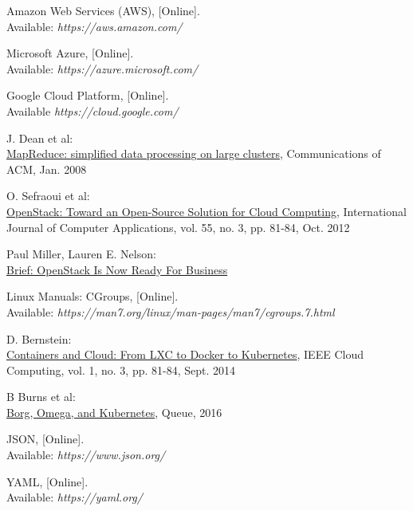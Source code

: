 \documentclass[officiallayout]{tktla}
\begin{document}
\begin{thebibliography}{9}

Amazon Web Services (AWS), [Online]. \\
Available: \textit{https://aws.amazon.com/}

Microsoft Azure, [Online]. \\
Available: \textit{https://azure.microsoft.com/}

Google Cloud Platform, [Online]. \\
Available \textit{https://cloud.google.com/}

J. Dean et al:
\\\href{https://dl.acm.org/doi/abs/10.1145/1327452.1327492}
{MapReduce: simplified data processing on large clusters},
Communications of ACM, Jan. 2008

O. Sefraoui et al:
\\\href{https://pdfs.semanticscholar.org/4be2/28917846a218ba00d30b42d709a11b7a5311.pdf}
{OpenStack: Toward an Open-Source Solution for Cloud Computing},
International Journal of Computer Applications, vol. 55, no. 3, pp. 81-84, Oct.
2012

Paul Miller, Lauren E. Nelson:
\\\href{https://object-storage-ca-ymq-1.vexxhost.net/swift/v1/6e4619c416ff4bd19e1c087f27a43eea/www-assets-prod/pdf-downloads/Brief-OpenStack-Is-Now-Ready.pdf}{Brief: OpenStack Is Now Ready For Business}

Linux Manuals: CGroups, [Online]. \\
Available: \textit{https://man7.org/linux/man-pages/man7/cgroups.7.html}

D. Bernstein:
\\\href{https://ieeexplore.ieee.org/abstract/document/7036275}{Containers and
Cloud: From LXC to Docker to Kubernetes},
IEEE Cloud Computing, vol. 1, no. 3, pp. 81-84, Sept. 2014

B Burns et al:
\\\href{https://dl.acm.org/doi/pdf/10.1145/2898442.2898444}{Borg, Omega, and
Kubernetes},
Queue, 2016

JSON, [Online]. \\
Available: \textit{https://www.json.org/}

YAML, [Online]. \\
Available: \textit{https://yaml.org/}


\end{thebibliography}
\end{document}
